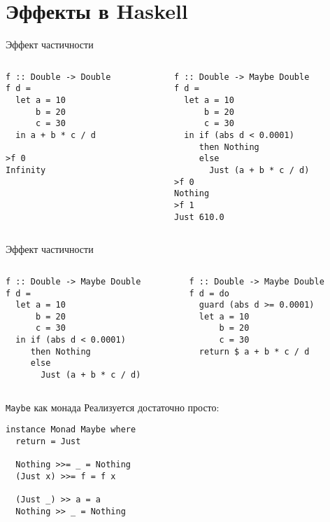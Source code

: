 \documentclass{beamer}
\begin{document}
\section{Эффекты в Haskell}
\begin{frame}[fragile]{Эффект частичности}
    \begin{columns}
      \begin{column}{0.5\textwidth}
\begin{verbatim}
f :: Double -> Double
f d =
  let a = 10
      b = 20
      c = 30
  in a + b * c / d

>f 0
Infinity
\end{verbatim}
      \end{column}
      \begin{column}{0.5\textwidth}
      \pause
\begin{verbatim}
f :: Double -> Maybe Double
f d =
  let a = 10
      b = 20
      c = 30
  in if (abs d < 0.0001)
     then Nothing
     else
       Just (a + b * c / d)
>f 0
Nothing
>f 1
Just 610.0
\end{verbatim}      
      \end{column}
    \end{columns}
\end{frame}
\begin{frame}[fragile]{Эффект частичности}
    \begin{columns}
      \begin{column}{0.5\textwidth}
\begin{verbatim}
f :: Double -> Maybe Double
f d =
  let a = 10
      b = 20
      c = 30
  in if (abs d < 0.0001)
     then Nothing
     else
       Just (a + b * c / d)
\end{verbatim}
      \end{column}
      \begin{column}{0.5\textwidth}
\begin{verbatim}
f :: Double -> Maybe Double
f d = do
  guard (abs d >= 0.0001)
  let a = 10
      b = 20
      c = 30
  return $ a + b * c / d
\end{verbatim}      
      \end{column}
    \end{columns}
\end{frame}
\begin{frame}[fragile]{\texttt{Maybe} как монада}
Реализуется достаточно просто:
\begin{verbatim}
instance Monad Maybe where
  return = Just
  
  Nothing >>= _ = Nothing
  (Just x) >>= f = f x
  
  (Just _) >> a = a
  Nothing >> _ = Nothing
\end{verbatim}
\end{frame}
\end{document}
